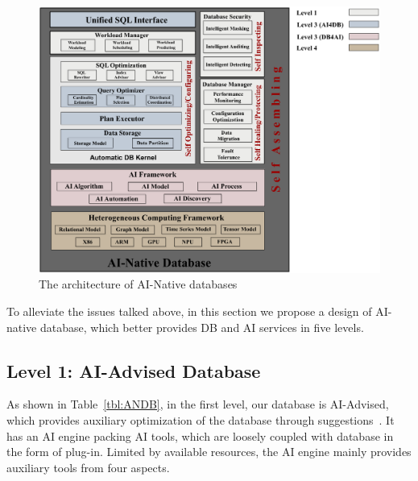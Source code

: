 

% 


\begin{figure}[!t]
\centering
\includegraphics[width=1.0\textwidth, height=0.92\textwidth]{figs/ANDB-arch.eps}
\vspace{-1em}
\caption{The architecture of AI-Native databases}
\label{fig:ANDB}
\vspace{-1em}
\end{figure}

 
To alleviate the issues talked above, in this section we propose a design of AI-native database, which better provides DB and AI services in five levels. 


\subsection{Level 1: AI-Advised Database}
\label{subsec: advised}
As shown in Table~\ref{tbl:ANDB}, in the first level, our database is AI-Advised, which provides auxiliary optimization of the database through suggestions~\cite{DBLP:conf/sigmod/AkenPGZ17, DBLP:journals/corr/abs-1802-00884, DBLP:conf/vldb/qtune19}.
It has an AI engine packing AI tools, which are loosely coupled with database in the form of plug-in. Limited by available resources, the AI engine mainly provides auxiliary tools from four aspects. 

